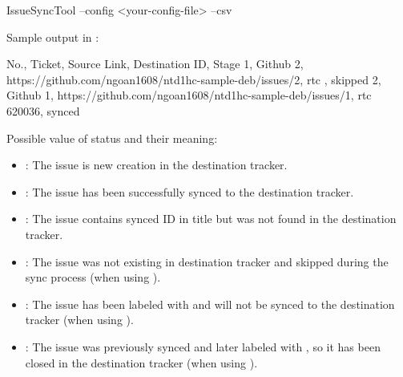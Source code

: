 \begin{pythonlog}
IssueSyncTool --config <your-config-file> --csv
\end{pythonlog}

Sample output in :
\begin{pythonlog}
No., Ticket, Source Link, Destination ID, Stage
1, Github 2, https://github.com/ngoan1608/ntd1hc-sample-deb/issues/2, rtc , skipped
2, Github 1, https://github.com/ngoan1608/ntd1hc-sample-deb/issues/1, rtc 620036, synced

\end{pythonlog}

Possible value of status and their meaning:
\begin{itemize}
   \item {}: The issue is new creation in the destination tracker.
   \item {}: The issue has been successfully synced to the
                         destination tracker.
   \item {}: The issue contains synced ID in title but was not
                            found in the destination tracker.
   \item {}: The issue was not existing in destination tracker and
                          skipped during the sync process (when using
                          ).
   \item {}: The issue has been labeled with  and will
                         not be synced to the destination tracker (when using
                         ).
   \item {}: The issue was previously synced and later labeled
                                with , so it has been closed in the
                                destination tracker (when using ).
\end{itemize}
